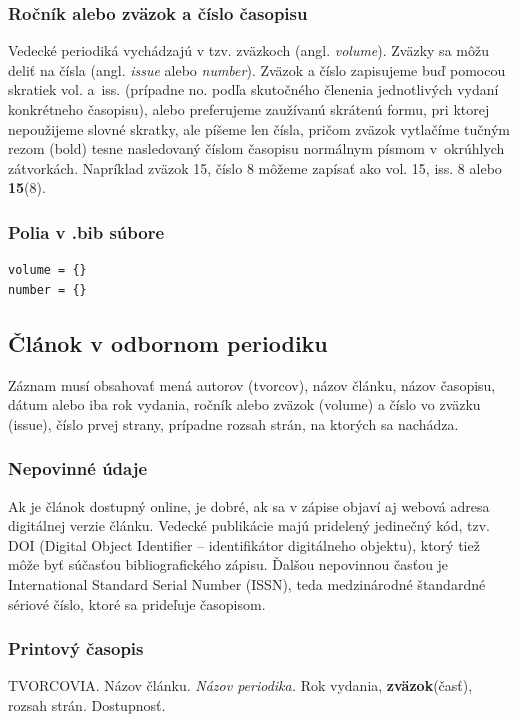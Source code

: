 \subsubsection*{Ročník alebo zväzok a číslo časopisu}
Vedecké periodiká vychádzajú v tzv. zväzkoch (angl. \foreignlanguage{english}{\it volume}). 
Zväzky sa môžu deliť na čísla
(angl. \foreignlanguage{english}{\it issue} alebo 
\foreignlanguage{english}{\it number}).
Zväzok a číslo zapisujeme buď pomocou skratiek vol. a~iss. 
(prípadne no. podľa skutočného členenia jednotlivých vydaní konkrétneho časopisu),
alebo preferujeme zaužívanú skrátenú formu,
pri ktorej nepoužijeme slovné skratky,
ale píšeme len čísla,
pričom zväzok vytlačíme tučným rezom (bold)
tesne nasledovaný číslom časopisu normálnym písmom
v~okrúhlych zátvorkách.
Napríklad zväzok 15, číslo 8 môžeme zapísať
ako vol. 15, iss. 8 alebo \textbf{15}(8).

\subsubsection*{\normalsize Polia v .bib súbore}
\begin{verbatim}
volume = {}
number = {}
\end{verbatim}

\subsection{Článok v odbornom periodiku}
Záznam musí obsahovať mená autorov (tvorcov), názov článku, názov časopisu, dátum alebo iba rok vydania, ročník alebo zväzok (volume) a číslo vo zväzku (issue), číslo prvej strany, prípadne rozsah strán, na ktorých sa nachádza.

\subsubsection*{\normalsize Nepovinné údaje}
Ak je článok dostupný online, je dobré, ak sa v zápise objaví aj webová adresa digitálnej verzie článku. Vedecké publikácie majú pridelený jedinečný kód, tzv. DOI (Digital Object Identifier – identifikátor digitálneho objektu), ktorý tiež môže byť súčasťou bibliografického zápisu. Ďalšou nepovinnou časťou je International Standard Serial Number (ISSN), teda medzinárodné štandardné sériové číslo, ktoré sa prideľuje časopisom.

\subsubsection*{\normalsize Printový časopis}
\begin{trivlist}
\item TVORCOVIA. Názov článku. \textit{Názov periodika.} Rok vydania, \textbf{zväzok}(časť), rozsah strán. Dostupnosť.
\end{trivlist}

